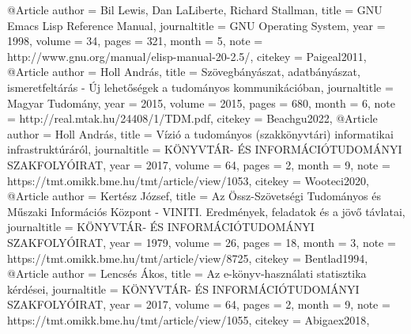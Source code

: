 @Article{
  author = {Bil Lewis, Dan LaLiberte, Richard Stallman},
  title = {GNU Emacs Lisp Reference Manual},
  journaltitle = {GNU Operating System},
  year = {1998},
  volume = {34},
  pages = {321},
  month = {5},
  note = {http://www.gnu.org/manual/elisp-manual-20-2.5/},
  citekey = {Paigeal2011},
}
@Article{
  author = {Holl András},
  title = {Szövegbányászat, adatbányászat, ismeretfeltárás - Új lehetőségek a tudományos kommunikációban},
  journaltitle = {Magyar Tudomány},
  year = {2015},
  volume = {2015},
  pages = {680},
  month = {6},
  note = {http://real.mtak.hu/24408/1/TDM.pdf},
  citekey = {Beachgu2022},
}
@Article{
  author = {Holl András},
  title = {Vízió a tudományos (szakkönyvtári) informatikai infrastruktúráról},
  journaltitle = {KÖNYVTÁR- ÉS INFORMÁCIÓTUDOMÁNYI SZAKFOLYÓIRAT},
  year = {2017},
  volume = {64},
  pages = {2},
  month = {9},
  note = {https://tmt.omikk.bme.hu/tmt/article/view/1053},
  citekey = {Wooteci2020},
}
@Article{
  author = {Kertész József},
  title = {Az Össz-Szövetségi Tudományos és Műszaki Információs Központ - VINITI. Eredmények, feladatok és a jövő távlatai},
  journaltitle = {KÖNYVTÁR- ÉS INFORMÁCIÓTUDOMÁNYI SZAKFOLYÓIRAT},
  year = {1979},
  volume = {26},
  pages = {18},
  month = {3},
  note = {https://tmt.omikk.bme.hu/tmt/article/view/8725},
  citekey = {Bentlad1994},
}
@Article{
  author = {Lencsés Ákos},
  title = {Az e-könyv-használati statisztika kérdései},
  journaltitle = {KÖNYVTÁR- ÉS INFORMÁCIÓTUDOMÁNYI SZAKFOLYÓIRAT},
  year = {2017},
  volume = {64},
  pages = {2},
  month = {9},
  note = {https://tmt.omikk.bme.hu/tmt/article/view/1055},
  citekey = {Abigaex2018},
}